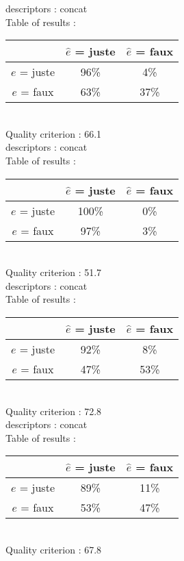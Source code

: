 descriptors : concat \\
Table of results : \\
\begin{tabular}{|c|c|c|}
\hline				& $\hat{e}$ = juste & $\hat{e}$ = faux \\
\hline  $e$ = juste	&     96\%			&      4\%		\\
\hline  $e$ = faux	&     63\%			&     37\%		\\
\hline
\end{tabular}\\
Quality criterion :   66.1 \\

descriptors : concat \\
Table of results : \\
\begin{tabular}{|c|c|c|}
\hline				& $\hat{e}$ = juste & $\hat{e}$ = faux \\
\hline  $e$ = juste	&    100\%			&      0\%		\\
\hline  $e$ = faux	&     97\%			&      3\%		\\
\hline
\end{tabular}\\
Quality criterion :   51.7 \\

descriptors : concat \\
Table of results : \\
\begin{tabular}{|c|c|c|}
\hline				& $\hat{e}$ = juste & $\hat{e}$ = faux \\
\hline  $e$ = juste	&     92\%			&      8\%		\\
\hline  $e$ = faux	&     47\%			&     53\%		\\
\hline
\end{tabular}\\
Quality criterion :   72.8 \\

descriptors : concat \\
Table of results : \\
\begin{tabular}{|c|c|c|}
\hline				& $\hat{e}$ = juste & $\hat{e}$ = faux \\
\hline  $e$ = juste	&     89\%			&     11\%		\\
\hline  $e$ = faux	&     53\%			&     47\%		\\
\hline
\end{tabular}\\
Quality criterion :   67.8 \\

